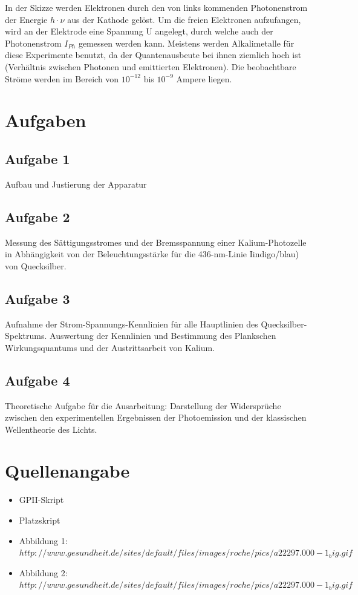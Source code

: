\documentclass{article}
\begin{document}
In der Skizze werden Elektronen durch den von links kommenden Photonenstrom der Energie \(h\cdot \nu\) aus der Kathode gelöst. Um die freien Elektronen aufzufangen, wird an der Elektrode eine Spannung U angelegt, durch welche auch der Photonenstrom \(I_{Ph}\) gemessen werden kann. Meistens werden Alkalimetalle für diese Experimente benutzt, da der Quantenausbeute bei ihnen ziemlich hoch ist (Verhältnis zwischen Photonen und emittierten Elektronen). Die beobachtbare Ströme werden im Bereich von \(10^{-12}\) bis \(10^{-9}\) Ampere liegen.
\newpage
\section{Aufgaben}

\subsection{Aufgabe 1}
Aufbau und Justierung der Apparatur

\subsection{Aufgabe 2}
Messung des Sättigungsstromes und der Bremsspannung einer Kalium-Photozelle in Abhängigkeit von der Beleuchtungsstärke für die 436-nm-Linie Iindigo/blau) von Quecksilber.

\subsection{Aufgabe 3}
Aufnahme der Strom-Spannungs-Kennlinien für alle Hauptlinien des Quecksilber-Spektrums. Auswertung der Kennlinien und Bestimmung des Plankschen Wirkungsquantums und der Austrittsarbeit von Kalium.

\subsection{Aufgabe 4}
Theoretische Aufgabe für die Ausarbeitung: Darstellung der Widersprüche zwischen den experimentellen Ergebnissen der Photoemission und der klassischen Wellentheorie des Lichts.

\newpage
\section{Quellenangabe}
\begin{itemize}
\item GPII-Skript
\item Platzskript
\item Abbildung 1: \(http://www.gesundheit.de/sites/default/files/images/roche/pics/a22297.000-1_big.gif\)
\item Abbildung 2:  \(http://www.gesundheit.de/sites/default/files/images/roche/pics/a22297.000-1_big.gif\)
\end{itemize}

\newpage
\end{document}
